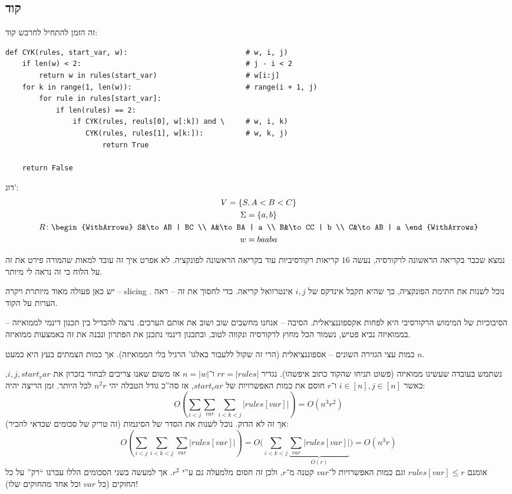 \documentclass[]{article}
\newcommand\sen   {\selectlanguage{english}}
\newcommand\she   {\selectlanguage{hebrew}}
\newcommand\del   {$ \!\! $}
\newcommand\Si    {\Sigma}
\begin{document}
	\pagebreak
	\subsection{קוד}
	זה הזמן להתחיל לחרבש קוד: 
	\sen
	\begin{lstlisting}
def CYK(rules, start_var, w):                            # w, i, j)
	if len(w) < 2:                                       # j - i < 2
		return w in rules(start_var)                     # w[i:j]
	for k in range(1, len(w)):                           # range(i + 1, j)
		for rule in rules[start_var]: 
			if len(rules) == 2: 
				if CYK(rules, reuls[0], w[:k]) and \     # w, i, k)
				   CYK(rules, rules[1], w[k:]):          # w, k, j)
				       return True
				   
	return False\end{lstlisting}
	\she
	
	דוג': 
	\begin{gather}
		V = \{S, A< B< C\} \\
		\Si = \{a, b\} \\
		R \colon \begin{WithArrows}
			S&\to AB | BC \\
			A&\to BA | a \\
			B&\to CC | b \\
			C&\to AB | a
		\end{WithArrows} \\
		w = baaba
	\end{gather}
	
	נמצא שכבר בקריאה הראשונה לרקורסיה, נעשה $16$ קריאות רקורסיביות עוד בקריאה הראשונה לפונקציה. לא אפרט איך זה עובד למאות שהמורה פירט את זה על הלוח כי זה נראה לי מיותר. 
	
	יש כאן פעולה מאוד מיותרת ויקרה – slicing \del. נוכל לשנות את חתימת הפונקציה, כך שהיא תקבל אינדקס של $i, j$ אינטרוואל קריאה. כדי לחסוך את זה – ראה הערות על הקוד. 
	
	הסיבוכיות של המימוש הרקורסיבי היא לפחות אקספוננציאלית. הסיבה – אנחנו מחשבים שוב ושוב את אותם הערכים. נרצה להבדיל בין תכנון דינמי לממואיזה – בממואיזה נביא פטיש, נשמור הכל מחוץ לרקורסיה ונקווה לטוב, ובתכנון דינמי נתכנן את הפתרון ונבנה את זה באמצעות ממואיזה. 
	
	כמות עצי הגזירה השונים – אספוננציאלית (הרי זה שקול ללעבור באלגו' הרגיל בלי הממואיזה). אך כמות הצמתים בעץ היא כמעט $n$. 
	
	נשתמש בעובדה שעשינו ממואיזה (פשוט תניחו שהקוד כתוב איפשהו). נגדיר $rr = |rules|$ ו־$n = |w|$ אז משום שאנו צריכים לבחור בזכרון את $i, j, start_var$, כאשר $i \in [n], j \in [n]$ ו־$r$ חוסם את כמות האפשרויות של $start_var$, אז סה''כ גודל הטבלה יהי $n^2r$ לכל היותר. זמן הריצה יהיה: 
	\[ O\left (\sum_{i < j} \sum_{var} \sum_{i < k < j} |rules[var]| \right ) = O(n^3r^2) \]
	אך זה לא הדוק. נוכל לשנות את הסדר של הסיגמות (זה טריק של סכומים שכדאי להכיר): 
	\[ O\left (\sum_{i < j} \sum_{i < k < j} \sum_{var} |rules[var]| \right ) = O\Bigg (\sum_{i < k < j} \underbrace{\sum_{var} |rules[var]|}_{O(r)} \Bigg ) = O(n^3r) \]
	אומנם $rules[var] \le r$ וגם כמות האפשרויות ל־$var$ קטנה מ־$r$, ולכן זה חסום מלמעלה גם ע''י $r^2$. אך למעשה בשני הסכומים הללו עברנו ``רק'' על כל החוקים (כל $var$ וכל אחד מהחוקים שלו)! 
	
	
	
	
\end{document}
